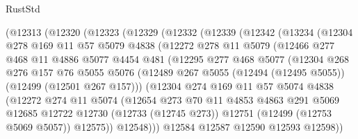 \begin{lexlean}{RustStd}
\begin{coremodule}
    (@12313
      (@12320
        (@12323
          (@12329
            (@12332
              (@12339
                (@12342
                  (@13234
                    (@12304
                      @278
                      @169
                      @11
                      @57
                      @5079
                      @4838
                      (@12272
                        @278
                        @11
                        @5079
                        (@12466
                          @277
                          @468
                          @11
                          @4886
                          @5077
                          @4454
                          @481
                          (@12295
                            @277
                            @468
                            @5077
                            (@12304
                              @268
                              @276
                              @157
                              @76
                              @5055
                              @5076
                              (@12489
                                @267
                                @5055
                                (@12494 (@12495 @5055))
                                (@12499 (@12501 @267 @157)))
                              (@12304
                                @274
                                @169
                                @11
                                @57
                                @5074
                                @4838
                                (@12272
                                  @274
                                  @11
                                  @5074
                                  (@12654
                                    @273
                                    @70
                                    @11
                                    @4853
                                    @4863
                                    @291
                                    @5069
                                    @12685
                                    @12722
                                    @12730
                                    (@12733 (@12745 @273))
                                    @12751
                                    (@12499 (@12753 @5069 @5057))
                                    @12575))
                                @12548)))
                          @12584
                          @12587
                          @12590
                          @12593
                          @12598))

\end{coremodule}
\end{lexlean}

